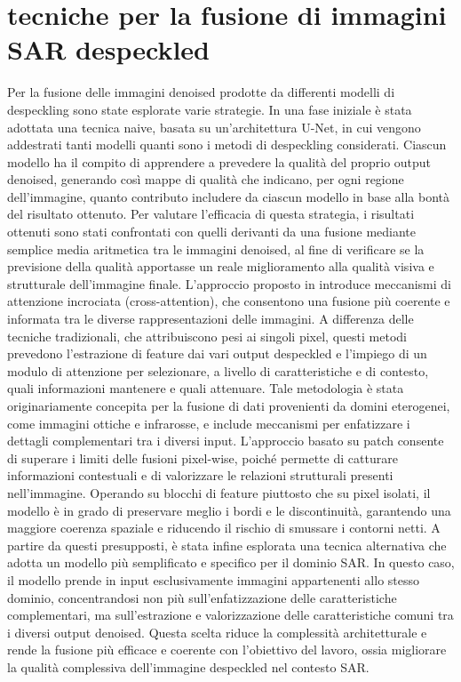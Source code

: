 
\chapter{tecniche per la fusione di immagini SAR despeckled}
Per la fusione delle immagini denoised prodotte da differenti modelli di despeckling sono state esplorate varie strategie.
In una fase iniziale è stata adottata una tecnica naive, basata su un’architettura U-Net, in cui vengono addestrati 
tanti modelli quanti sono i metodi di despeckling considerati.
Ciascun modello ha il compito di apprendere a prevedere la qualità del proprio output denoised, generando così mappe 
di qualità che indicano, per ogni regione dell’immagine, quanto contributo includere da ciascun modello in 
base alla bontà del risultato ottenuto.
Per valutare l’efficacia di questa strategia, i risultati ottenuti sono stati confrontati con quelli derivanti 
da una fusione mediante semplice media aritmetica tra le immagini denoised, al fine di verificare se 
la previsione della qualità apportasse un reale miglioramento alla qualità visiva e strutturale dell’immagine finale.
L’approccio proposto in \cite{li2024crossfuse} introduce meccanismi di attenzione incrociata (cross-attention), 
che consentono una fusione più coerente e informata tra le diverse rappresentazioni delle immagini.
A differenza delle tecniche tradizionali, che attribuiscono pesi ai singoli pixel, questi metodi prevedono 
l’estrazione di feature dai vari output despeckled e l’impiego di un modulo di attenzione per selezionare, 
a livello di caratteristiche e di contesto, quali informazioni mantenere e quali attenuare.
Tale metodologia è stata originariamente concepita per la fusione di dati provenienti da domini eterogenei, 
come immagini ottiche e infrarosse, e include meccanismi per enfatizzare i dettagli complementari tra i diversi input.
L’approccio basato su patch consente di superare i limiti delle fusioni pixel-wise, poiché permette di catturare informazioni 
contestuali e di valorizzare le relazioni strutturali presenti nell’immagine.
Operando su blocchi di feature piuttosto che su pixel isolati, il modello è in grado di preservare meglio i bordi e le 
discontinuità, garantendo una maggiore coerenza spaziale e riducendo il rischio di smussare i contorni netti.
A partire da questi presupposti, è stata infine esplorata una tecnica alternativa che adotta un modello più semplificato 
e specifico per il dominio SAR.
In questo caso, il modello prende in input esclusivamente immagini appartenenti allo stesso dominio, concentrandosi 
non più sull’enfatizzazione delle caratteristiche complementari, ma sull’estrazione e valorizzazione 
delle caratteristiche comuni tra i diversi output denoised.
Questa scelta riduce la complessità architetturale e rende la fusione più efficace e coerente con l’obiettivo del 
lavoro, ossia migliorare la qualità complessiva dell’immagine despeckled nel contesto SAR.


